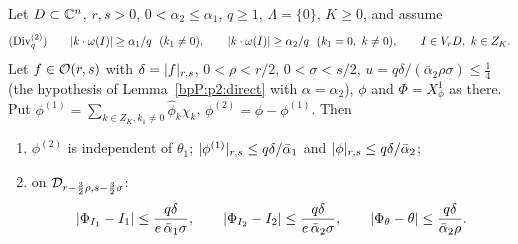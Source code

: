 \begin{lemma}\label{bpP:p2:split}
Let $D\subset\mathbb{C}^n$, $r,s>0$, $0<\alpha_2\le\alpha_1$, $q\ge1$, $\Lambda=\{0\}$, $K\ge0$, and assume
\[(\mathrm{Div}_q^{(2)})\qquad \abs{k\cdot\omega(I)}\ge\alpha_1/q\ \ (k_1\ne0),\qquad \abs{k\cdot\omega(I)}\ge\alpha_2/q\ \ (k_1=0,\ k\ne0),\qquad I\in V_rD,\ k\in Z_K.\]
Let $f\in\mathcal O(r,s)$ with $\delta=\lvert f\rvert_{r,s}$, $0<\rho<r/2$, $0<\sigma<s/2$, $u=q\delta/(\bar\alpha_2\rho\sigma)\le\frac14$ (the hypothesis of Lemma~\ref{bpP:p2:direct} with $\alpha=\alpha_2$), $\phi$ and $\Phi=X^1_\phi$ as there. Put $\phi^{(1)}=\sum_{k\in Z_K,k_1\ne0}\hat\phi_k\chi_k$, $\phi^{(2)}=\phi-\phi^{(1)}$. Then
\begin{enumerate}[label=(\alph*)]
\item $\phi^{(2)}$ is independent of $\theta_1$; $\lvert \phi^{(1)}\rvert_{r,s}\le q\delta/\bar\alpha_1$ and $\lvert \phi\rvert_{r,s}\le q\delta/\bar\alpha_2$;
\item on $\mathcal D_{r-\frac32\rho,s-\frac32\sigma}$:
\[\lvert \Phi_{I_1}-I_1\rvert\le\frac{q\delta}{e\,\bar\alpha_1\sigma},\qquad\lvert \Phi_{I_2}-I_2\rvert\le\frac{q\delta}{e\,\bar\alpha_2\sigma},\qquad\lvert \Phi_\theta-\theta\rvert\le\frac{q\delta}{\bar\alpha_2\rho}.\]
\end{enumerate}
\end{lemma}

